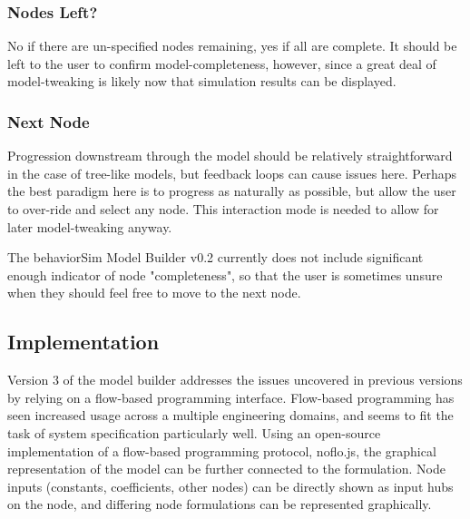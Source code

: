 \documentclass[conference]{IEEEtran}
\begin{document}

\subsubsection{Nodes Left?}
No if there are un-specified nodes remaining, yes if all are complete. 
It should be left to the user to confirm model-completeness, however, since a great deal of model-tweaking is likely now that simulation results can be displayed.

\subsubsection{Next Node}
Progression downstream through the model should be relatively straightforward in the case of tree-like models, but feedback loops can cause issues here. 
Perhaps the best paradigm here is to progress as naturally as possible, but allow the user to over-ride and select any node. 
This interaction mode is needed to allow for later model-tweaking anyway. 

The behaviorSim Model Builder v0.2 currently does not include significant enough indicator of node "completeness", so that the user is sometimes unsure when they should feel free to move to the next node.

\subsection{Implementation}
Version 3 of the model builder addresses the issues uncovered in previous versions by relying on a flow-based programming interface.
Flow-based programming has seen increased usage across a multiple engineering domains, and seems to fit the task of system specification particularly well.
Using an open-source implementation of a flow-based programming protocol, noflo.js, the graphical representation of the model can be further connected to the formulation.  %
Node inputs (constants, coefficients, other nodes) can be directly shown as input hubs on the node, and differing node formulations can be represented graphically.

\end{document}
